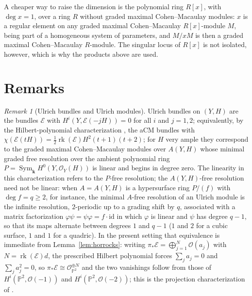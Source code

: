 \documentclass[11pt]{amsart}
\theoremstyle{remark}
\newtheorem{remark}[theorem]{Remark}
\theoremstyle{definition}
\newcommand{\PP}{\mathbb{P}}
\newcommand{\bk}{\mathbf{k}}
\newcommand{\cO}{\mathcal{O}}
\newcommand{\cE}{\mathcal{E}}
\newcommand{\rk}{\operatorname{rk}}
\DeclareMathOperator{\Sym}{Sym}
\begin{document}
A cheaper way to raise the dimension is the polynomial ring $R[x]$, with $\deg x=1$, over a ring $R$ without graded maximal Cohen--Macaulay modules: $x$ is a regular element on any graded maximal Cohen--Macaulay $R[x]$-module $M$, being part of a homogeneous system of parameters, and $M/xM$ is then a graded maximal Cohen--Macaulay $R$-module. The singular locus of $R[x]$ is not isolated, however, which is why the products above are used.

\section{Remarks}\label{sec:remarks}

\begin{remark}[Ulrich bundles and Ulrich modules]\label{rem:ulrich}
Ulrich bundles on $(Y,H)$ are the bundles $\cE$ with $H^i(Y,\cE(-jH))=0$ for all $i$ and $j=1,2$; equivalently, by the Hilbert-polynomial characterization \cite[Prop.~2.1 and Cor.~2.2]{ES}, the aCM bundles with $\chi(\cE(tH))=\tfrac12\rk(\cE)H^2(t+1)(t+2)$; for $H$ very ample they correspond to the graded maximal Cohen--Macaulay modules over $A(Y,H)$ whose minimal graded free resolution over the ambient polynomial ring $P=\Sym_{\bk}H^0(Y,\cO_Y(H))$ is linear and begins in degree zero. The linearity in this characterization refers to the $P$-free resolution; the $A(Y,H)$-free resolution need not be linear: when $A=A(Y,H)$ is a hypersurface ring $P/(f)$ with $\deg f=q\ge2$, for instance, the minimal $A$-free resolution of an Ulrich module is the infinite resolution, $2$-periodic up to a grading shift by $q$, associated with a matrix factorization $\varphi\psi=\psi\varphi=f\cdot\mathrm{id}$ in which $\varphi$ is linear and $\psi$ has degree $q-1$, so that its maps alternate between degrees $1$ and $q-1$ ($1$ and $2$ for a cubic surface, $1$ and $1$ for a quadric). In the present setting that equivalence is immediate from Lemma~\ref{lem:horrocks}: writing $\pi_*\cE=\bigoplus_{j=1}^N\cO(a_j)$ with $N=\rk(\cE)d$, the prescribed Hilbert polynomial forces $\sum_ja_j=0$ and $\sum_ja_j^2=0$, so $\pi_*\cE\cong\cO_{\PP^2}^{\oplus N}$ and the two vanishings follow from those of $H^i(\PP^2,\cO(-1))$ and $H^i(\PP^2,\cO(-2))$; this is the projection characterization of \cite[\S2]{ES}.


\end{remark}
\end{document}
